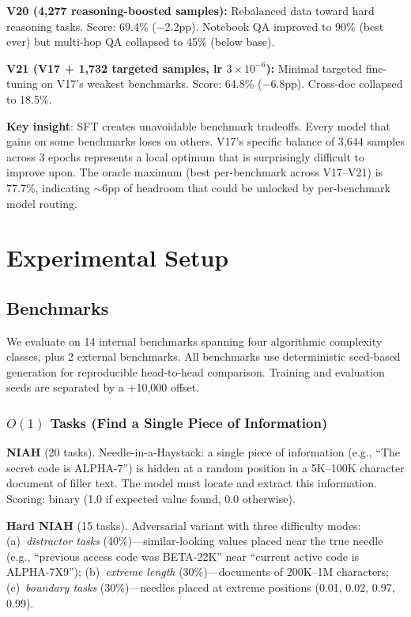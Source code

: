 \documentclass{article}
\begin{document}
\textbf{V20 (4,277 reasoning-boosted samples):} Rebalanced data toward hard reasoning tasks. Score: 69.4\% ($-$2.2pp). Notebook QA improved to 90\% (best ever) but multi-hop QA collapsed to 45\% (below base).

\textbf{V21 (V17 + 1,732 targeted samples, lr $3{\times}10^{-6}$):} Minimal targeted fine-tuning on V17's weakest benchmarks. Score: 64.8\% ($-$6.8pp). Cross-doc collapsed to 18.5\%.

\textbf{Key insight}: SFT creates unavoidable benchmark tradeoffs. Every model that gains on some benchmarks loses on others. V17's specific balance of 3,644 samples across 3 epochs represents a local optimum that is surprisingly difficult to improve upon. The oracle maximum (best per-benchmark across V17--V21) is 77.7\%, indicating $\sim$6pp of headroom that could be unlocked by per-benchmark model routing.

\section{Experimental Setup}
\label{sec:experiments}

\subsection{Benchmarks}

We evaluate on 14 internal benchmarks spanning four algorithmic complexity classes, plus 2 external benchmarks. All benchmarks use deterministic seed-based generation for reproducible head-to-head comparison. Training and evaluation seeds are separated by a +10,000 offset.

\subsubsection{$O(1)$ Tasks (Find a Single Piece of Information)}

\textbf{NIAH} (20 tasks). Needle-in-a-Haystack: a single piece of information (e.g., ``The secret code is ALPHA-7'') is hidden at a random position in a 5K--100K character document of filler text. The model must locate and extract this information. Scoring: binary (1.0 if expected value found, 0.0 otherwise).

\textbf{Hard NIAH} (15 tasks). Adversarial variant with three difficulty modes: (a)~\emph{distractor tasks} (40\%)---similar-looking values placed near the true needle (e.g., ``previous access code was BETA-22K'' near ``current active code is ALPHA-7X9''); (b)~\emph{extreme length} (30\%)---documents of 200K--1M characters; (c)~\emph{boundary tasks} (30\%)---needles placed at extreme positions (0.01, 0.02, 0.97, 0.99).
\end{document}

